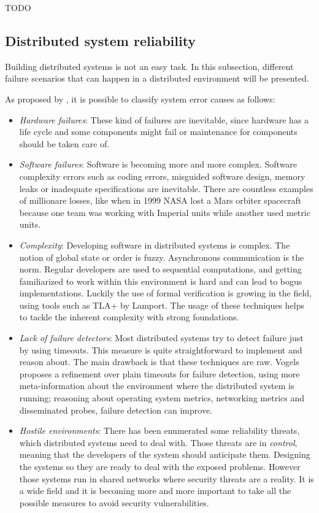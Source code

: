 TODO


\subsection{Distributed system reliability}

Building distributed systems is not an easy task. In this subsection, different
failure scenarios that can happen in a distributed environment will be presented.

As proposed by \cite{GuideReliable}, it is possible to classify system error
causes as follows:
\begin{itemize}
\item \textit{Hardware failures}: These kind of failures are inevitable, since
  hardware has a life cycle and some components might fail or maintenance for
  components should be taken care of.
\item \textit{Software failures}: Software is becoming more and more complex.
  Software complexity errors such as coding errors, misguided software design,
  memory leaks or inadequate specifications are inevitable. There are countless
  examples of millionare losses, like when in 1999 NASA lost a Mars orbiter
  spacecraft because one team was working with Imperial units while another used
  metric units.
\item \textit{Complexity}: Developing software in distributed systems is
  complex. The notion of global state or order is fuzzy. Asynchronous
  communication is the norm. Regular developers are used to sequential
  computations, and getting familiarized to work within this environment is hard
  and can lead to bogus implementations. Luckily the use of formal verification
  is growing in the field, using tools such as TLA+\cite{tla} by Lamport. The
  usage of these techniques helps to tackle the inherent complexity with strong
  foundations.
\item \textit{Lack of failure detectors}: Most distributed systems try to detect
  failure just by using timeouts. This measure is quite straightforward to
  implement and reason about. The main drawback is that these techniques are
  raw. Vogels \cite{vogels} proposes a refinement over plain timeouts for
  failure detection, using more meta-information about the environment where
  the distributed system is running; reasoning about operating system metrics,
  networking metrics and disseminated probes, failure detection can improve.
\item \textit{Hostile environments}: There has been enumerated some reliability
  threats, which distributed systems need to deal with. Those threats are in
  \textit{control}, meaning that the developers of the system should anticipate
  them. Designing the systems so they are ready to deal with the exposed
  problems. However those systems run in shared networks where security threats
  are a reality. It is a wide field and it is becoming more and more important
  to take all the possible measures to avoid security vulnerabilities.
\end{itemize}


